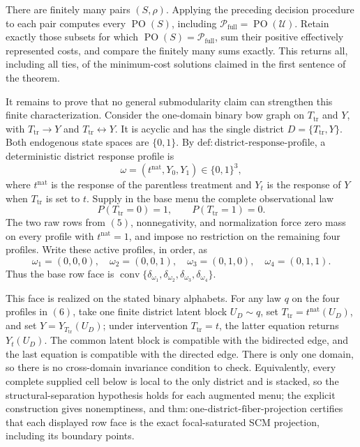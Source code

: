 There are finitely many pairs \((S,\rho)\).  Applying the preceding decision
procedure to each pair computes every \(\operatorname{PO}(S)\), including
\(\mathcal P_{\mathrm{full}}=\operatorname{PO}(\mathcal U)\).  Retain
exactly those subsets for which
\(\operatorname{PO}(S)=\mathcal P_{\mathrm{full}}\), sum their positive
effectively represented costs, and compare the finitely many sums exactly.
This returns all, including all ties, of the minimum-cost solutions claimed in
the first sentence of the theorem.

It remains to prove that no general submodularity claim can strengthen this
finite characterization.  Consider the one-domain binary bow graph on
\(T_{\mathrm{tr}}\) and \(Y\), with
\(T_{\mathrm{tr}}\to Y\) and
\(T_{\mathrm{tr}}\leftrightarrow Y\).  It is acyclic and has the single
district \(D=\{T_{\mathrm{tr}},Y\}\).  Both endogenous state spaces are
\(\{0,1\}\).  By
\(\mathrm{def:district\text{-}response\text{-}profile}\), a deterministic
district response profile is
\[
\omega=(t^{\mathrm{nat}},Y_0,Y_1)\in\{0,1\}^3,
\tag{4}
\]
where \(t^{\mathrm{nat}}\) is the response of the parentless treatment and
\(Y_t\) is the response of \(Y\) when \(T_{\mathrm{tr}}\) is set to
\(t\).  Supply in the base menu the complete observational law
\[
P(T_{\mathrm{tr}}=0)=1,
\qquad P(T_{\mathrm{tr}}=1)=0.
\tag{5}
\]
The two raw rows from \((5)\), nonnegativity, and normalization force zero
mass on every profile with \(t^{\mathrm{nat}}=1\), and impose no restriction
on the remaining four profiles.  Write these active profiles, in order, as
\[
\omega_1=(0,0,0),\quad
\omega_2=(0,0,1),\quad
\omega_3=(0,1,0),\quad
\omega_4=(0,1,1).
\tag{6}
\]
Thus the base row face is
\(\operatorname{conv}\{\delta_{\omega_1},\delta_{\omega_2},
\delta_{\omega_3},\delta_{\omega_4}\}\).

This face is realized on the stated binary alphabets.  For any law \(q\) on
the four profiles in \((6)\), take one finite district latent block
\(U_D\sim q\), set \(T_{\mathrm{tr}}=t^{\mathrm{nat}}(U_D)\), and set
\(Y=Y_{T_{\mathrm{tr}}}(U_D)\); under intervention
\(T_{\mathrm{tr}}=t\), the latter equation returns \(Y_t(U_D)\).
The common latent block is compatible with the bidirected edge, and the last
equation is compatible with the directed edge.  There is only one domain, so
there is no cross-domain invariance condition to check.  Equivalently, every
complete supplied cell below is local to the only district and is stacked, so
the structural-separation hypothesis holds for each augmented menu; the
explicit construction gives nonemptiness, and
\(\mathrm{thm:one\text{-}district\text{-}fiber\text{-}projection}\)
certifies that each displayed row face is the exact focal-saturated SCM
projection, including its boundary points.

